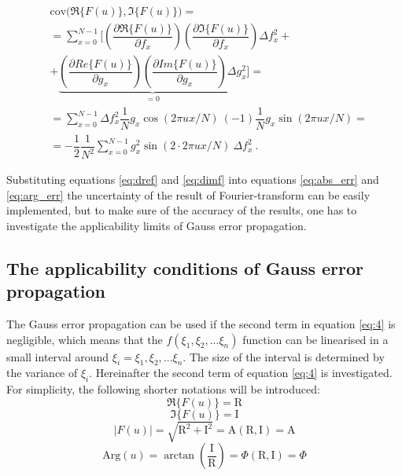 \documentclass[a4paper,12pt,oneside]{article}
\newcommand{\Abs}{\mathrm{A}}
\newcommand{\Arg}{\Phi}
\newcommand{\R}{\mathrm{R}}
\newcommand{\I}{\mathrm{I}}
\begin{document}
\begin{eqnarray}\label{eq:cov1}
  & \mathrm{cov} \Big( \Re\{F(u)\}, \Im\{F(u)\} \Big) = \nonumber\\
  & = \sum\limits_{x=0}^{N-1} \Bigg[
  \left( \dfrac{\partial \Re\{ F(u) \}}{\partial f_x} \right) \left( \dfrac{\partial \Im\{ F(u) \}}{\partial f_x} \right) \Delta f_x^2 + \nonumber\\
  & + \underbrace{ \left( \dfrac{\partial Re\{ F(u) \}}{\partial g_x} \right) \left( \dfrac{\partial Im\{ F(u) \}}{\partial g_x} \right) \Delta g_x^2}_\text{$=0$} \Bigg] = \nonumber\\
  & = \sum\limits_{x=0}^{N-1} \Delta f_x^2 \dfrac{1}{N} g_x \cos(2\pi ux/N)\ (-1) \dfrac{1}{N} g_x \sin(2\pi ux/N) = \nonumber\\
  & = -\dfrac{1}{2} \dfrac{1}{N^2} \sum\limits_{x=0}^{N-1} g_x^2 \sin(2 \cdot 2\pi ux/N)\ \Delta f_x^2 \ .
\end{eqnarray}

Substituting equations \eqref{eq:dref} and \eqref{eq:dimf} into equations \eqref{eq:abs_err} and \eqref{eq:arg_err} the uncertainty of the result of Fourier-transform can be easily implemented, but to make sure of the accuracy of the results, one has to investigate the applicability limits of Gauss error propagation.

\subsection{The applicability conditions of Gauss error propagation}\label{sec:limits}

The Gauss error propagation can be used if the second term in equation \eqref{eq:4} is negligible, which means that the $f(\xi_1, \xi_2, ... \xi_n)$ function can be linearised in a small interval around $\xi_i = \xi_1, \xi_2, ... \xi_n$. The size of the interval is determined by the variance of $\xi_i$. Hereinafter the second term of equation \eqref{eq:4} is investigated. For simplicity, the following shorter notations will be introduced:
$$\Re\{F(u)\} = \R$$
$$\Im\{F(u)\} = \I$$
$$|F(u)| = \sqrt{\R^2 + \I^2} = \Abs(\R, \I) = \Abs$$
$$\mathrm{Arg}(u) = \arctan\left({\frac{\I}{\R}}\right) = \Arg(\R, \I) = \Arg$$
\end{document}
